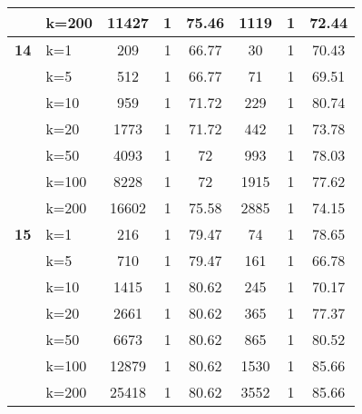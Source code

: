\begin{table}[htbp]
\begin{tabular}{|l|l|c|c|c|c|c|c|}
     & k=200 & 11427 & 1 & 75.46 & 1119 & 1 & 72.44 \\ \hline
    \multicolumn{1}{|r|}{\textbf{14}} & k=1 & 209 & 1 & 66.77 & 30 & 1 & 70.43 \\ 
     & k=5 & 512 & 1 & 66.77 & 71 & 1 & 69.51 \\ 
     & k=10 & 959 & 1 & 71.72 & 229 & 1 & 80.74 \\ 
     & k=20 & 1773 & 1 & 71.72 & 442 & 1 & 73.78 \\ 
     & k=50 & 4093 & 1 & 72 & 993 & 1 & 78.03 \\ 
     & k=100 & 8228 & 1 & 72 & 1915 & 1 & 77.62 \\ 
     & k=200 & 16602 & 1 & 75.58 & 2885 & 1 & 74.15 \\ \hline
    \multicolumn{1}{|r|}{\textbf{15}} & k=1 & 216 & 1 & 79.47 & 74 & 1 & 78.65 \\ 
     & k=5 & 710 & 1 & 79.47 & 161 & 1 & 66.78 \\ 
     & k=10 & 1415 & 1 & 80.62 & 245 & 1 & 70.17 \\ 
     & k=20 & 2661 & 1 & 80.62 & 365 & 1 & 77.37 \\ 
     & k=50 & 6673 & 1 & 80.62 & 865 & 1 & 80.52 \\ 
     & k=100 & 12879 & 1 & 80.62 & 1530 & 1 & 85.66 \\ 
     & k=200 & 25418 & 1 & 80.62 & 3552 & 1 & 85.66 \\ \hline
    \end{tabular}
\end{table}
